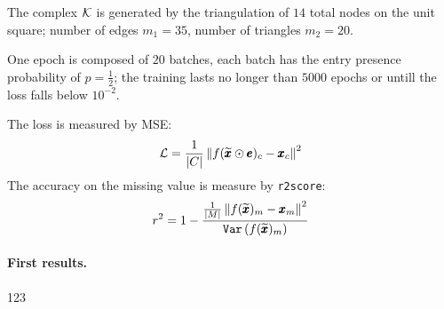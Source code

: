 \documentclass{mynotes}
\begin{document}
The complex \( \mathcal{K} \) is generated by the triangulation of \( 14 \) total nodes on the unit square; number of edges \( m_1 = 35\), number of triangles \( m_2 = 20 \). 

One epoch is composed of \( 20 \) batches, each batch has the entry presence probability of \( p = \frac{ 1 }{ 2 } \); the training lasts no longer than \( 5000 \) epochs or untill the loss falls below \( 10^{-2} \).

The loss is measured by MSE:
\begin{equation}
      \mathcal{L} = \frac{1}{ | C | } \left\| f( \widetilde{\pmb{x}} \odot \pmb{e} )_c - \pmb{x}_c \right\|^2 
\end{equation}
The accuracy on the missing value is measure by \texttt{r2score}:
\begin{equation}
      r^2 = 1 - \frac{ \frac{1}{|M|}  \left\| f( \widetilde{\pmb{x}} )_m - \pmb{x}_m \right\|^2   }{ \texttt{Var} \left( f( \widetilde{\pmb{x}} )_m \right) }
\end{equation}



\paragraph{First results. } 123
\end{document}
